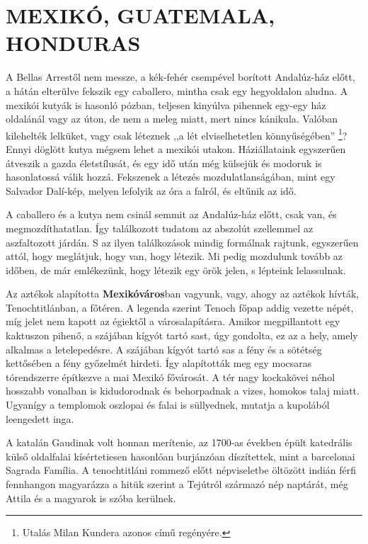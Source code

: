 \clearpage
\chapter{MEXIKÓ, GUATEMALA, HONDURAS}

A Bellas Arrestől nem messze, a kék-fehér csempével borított Andalúz-ház
előtt, a hátán elterülve fekszik egy caballero, mintha csak egy
hegyoldalon aludna. A mexikói kutyák is hasonló pózban, teljesen
kinyúlva pihennek egy-egy ház oldalánál vagy az úton, de nem a meleg
miatt, mert nincs kánikula. Valóban kilehelték lelküket, vagy csak
léteznek ,,a lét elviselhetetlen könnyűségében''%
\footnote{Utalás Milan Kundera azonos című regényére.}? Ennyi döglött kutya
mégsem lehet a mexikói utakon. Háziállataink egyszerűen átveszik
a gazda életstílusát, és egy idő után még külsejük és modoruk is
hasonlatossá válik hozzá. Fekszenek a létezés mozdulatlanságában, mint
egy Salvador Dalí-kép, melyen lefolyik az óra a falról, és eltűnik az idő.

A caballero és a kutya nem csinál semmit az Andalúz-ház előtt,
csak van, és megmozdíthatatlan. Így találkozott tudatom az abszolút
szellemmel az aszfaltozott járdán. S az ilyen találkozások mindig
formálnak rajtunk, egyszerűen attól, hogy meglátjuk, hogy van, hogy
létezik. Mi pedig mozdulunk tovább az időben, de már emlékezünk,
hogy létezik egy örök jelen, s lépteink lelassulnak.

\bigskip
Az aztékok alapította \textbf{Mexikóváros}ban vagyunk, vagy, ahogy az
aztékok hívták, Tenochtitlánban, a főtéren. A legenda szerint Tenoch
főpap addig vezette népét, míg jelet nem kapott az égiektől a
városalapításra. Amikor megpillantott egy kaktuszon pihenő, a szájában
kígyót tartó sast, úgy gondolta, ez az a hely, amely alkalmas a
letelepedésre. A szájában kígyót tartó sas a fény és a sötétség kettősében
a fény győzelmét hirdeti. Így alapították meg egy mocsaras tórendszerre
építkezve a mai Mexikó fővárosát. A tér nagy kockakövei néhol
hosszabb vonalban is kidudorodnak és behorpadnak a vizes, homokos
talaj miatt. Ugyanígy a templomok oszlopai és falai is süllyednek,
mutatja a kupolából leengedett inga.

A katalán Gaudinak volt honnan merítenie, az 1700-as években
épült katedrális külső oldalfalai kísértetiesen hasonlóan burjánzóan
díszítettek, mint a barcelonai Sagrada Família. A tenochtitláni rommező
előtt népviseletbe öltözött indián férfi fennhangon magyarázza
a hitük szerint a Tejútról származó nép naptárát, még Attila és a
magyarok is szóba kerülnek.

